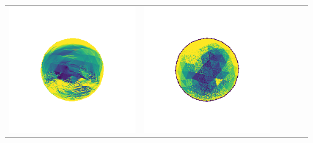 \begin{center}
\begin{tabularx}{\linewidth}{@{}Y@{}Y@{}Y@{}Y@{}Y@{}Y@{}}
\includegraphics[width=\linewidth]{semisynthetic/20160617_1_yu_err.png} &
\includegraphics[width=\linewidth]{semisynthetic/20160617_1_dpsn_err.png} &

\end{tabularx}
\end{center}
